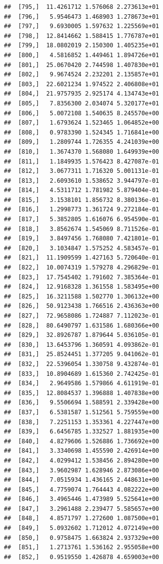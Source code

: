 \documentclass[article]{jss}\usepackage[]{graphicx}\usepackage[]{xcolor}
\makeatletter
\newenvironment{kframe}{%
 \def\at@end@of@kframe{}%
 \ifinner\ifhmode%
  \def\at@end@of@kframe{\end{minipage}}%
  \begin{minipage}{\columnwidth}%
 \fi\fi%
 \def\FrameCommand##1{\hskip\@totalleftmargin \hskip-\fboxsep
 \colorbox{shadecolor}{##1}\hskip-\fboxsep
     \hskip-\linewidth \hskip-\@totalleftmargin \hskip\columnwidth}%
 \MakeFramed {\advance\hsize-\width
   \@totalleftmargin\z@ \linewidth\hsize
   \@setminipage}}%
 {\par\unskip\endMakeFramed%
 \at@end@of@kframe}
\newenvironment{knitrout}{}{} %
\makeatother
\begin{document}
\begin{knitrout}
\begin{kframe}
\begin{verbatim}
##  [795,]  11.4261712 1.576068 2.273613e+01
##  [796,]   5.9546473 1.468903 1.278673e+01
##  [797,]   9.6930005 1.597632 1.225569e+01
##  [798,]  12.8414662 1.588415 1.776787e+01
##  [799,]  18.0802019 2.150300 1.405235e+01
##  [800,]   4.5816852 1.449461 1.894726e+01
##  [801,]  25.0670420 2.744598 1.407830e+01
##  [802,]   9.9674524 2.232201 2.135857e+01
##  [803,]  22.6021234 1.974522 2.406808e+01
##  [804,]  21.9757935 2.925174 4.134743e+01
##  [805,]   7.8356300 2.034074 5.320177e+01
##  [806,]   5.0072108 1.540635 8.245570e+00
##  [807,]   1.6793624 1.523465 1.064852e+00
##  [808,]   0.9783390 1.524345 1.716841e+00
##  [809,]   1.2809744 1.726355 4.241039e+00
##  [810,]   1.3674370 1.568080 1.649939e+00
##  [811,]   1.1849935 1.576423 8.427087e-01
##  [812,]   3.0677311 1.716320 5.001131e-01
##  [813,]   2.6093610 1.538652 3.944797e-01
##  [814,]   4.5311712 1.781982 5.879404e-01
##  [815,]   3.1538101 1.856732 8.380136e-01
##  [816,]   1.2998773 1.361724 9.272184e-01
##  [817,]   5.3852805 1.616076 6.954590e-01
##  [818,]   3.8562674 1.545069 8.711526e-01
##  [819,]   3.8497456 1.768080 7.421801e-01
##  [820,]   3.1034847 1.575252 4.583457e-01
##  [821,]  11.1909599 1.427163 5.720640e-01
##  [822,]  10.0074319 1.579278 4.296829e-01
##  [823,]  17.7545402 1.791602 7.385364e-01
##  [824,]  12.9168328 1.361558 1.583495e+00
##  [825,]  16.3211588 1.502770 1.306132e+00
##  [826,]  50.9123438 1.766516 2.436363e+00
##  [827,]  72.9658086 1.724887 7.112023e-01
##  [828,]  80.6490797 1.631586 1.680366e+00
##  [829,]  32.8926787 1.879644 5.036105e-01
##  [830,]  13.6453796 1.360591 4.093862e-01
##  [831,]  25.8524451 1.377205 9.041062e-01
##  [832,]  22.5396054 1.330758 9.432874e-01
##  [833,]  10.8904689 1.615360 2.742425e-01
##  [834,]   2.9649586 1.579866 4.611919e-01
##  [835,]  12.8084537 1.396888 1.407838e+00
##  [836,]   9.5506694 1.588591 2.339428e+00
##  [837,]   6.5381587 1.512561 5.759559e+00
##  [838,]   7.2251153 1.353361 4.227447e+00
##  [839,]   6.6456785 1.332527 1.881935e+00
##  [840,]   4.8279606 1.526886 1.736692e+00
##  [841,]   3.3340698 1.455590 2.426914e+00
##  [842,]   4.0299412 1.538456 2.894280e+00
##  [843,]   3.9602987 1.628946 2.873086e+00
##  [844,]   7.0515934 1.436165 2.448631e+00
##  [845,]   4.7759074 1.764443 4.082222e+00
##  [846,]   3.4965446 1.473989 5.525641e+00
##  [847,]   3.2961488 2.239477 5.585657e+00
##  [848,]   4.8571797 1.272600 1.087500e+01
##  [849,]   5.0932602 1.712012 4.072149e+00
##  [850,]   0.9758475 1.663824 2.937329e+00
##  [851,]   1.2713761 1.536162 2.955058e+00
##  [852,]   0.9519550 1.426878 4.659003e+00

\end{verbatim}
\end{kframe}
\end{knitrout}
\end{document}
